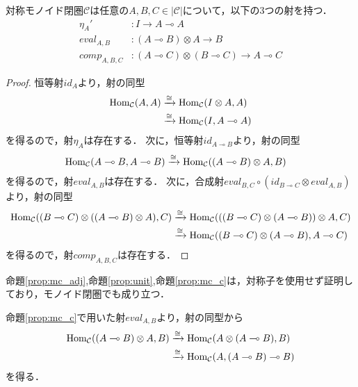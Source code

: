 \documentclass[type_judgement.tex]{subfiles}
\begin{document}
\begin{prop}
\label{prop:mc_c}
対称モノイド閉圏$\mathcal{C}$は任意の$A,B,C\in|\mathcal{C}|$について，以下の3つの射を持つ．
\begin{align*}
    \eta_{A}'    &: I \rightarrow A \multimap A \\
    eval_{A,B}   &: (A \multimap B) \otimes A \rightarrow B \\
    comp_{A,B,C} &: (A \multimap C) \otimes (B \multimap C) \rightarrow A \multimap C
\end{align*}
\end{prop}
\begin{proof}
恒等射$id_A$より，射の同型
\begin{align*}
    \mathop{\mathrm{Hom}}\nolimits_\mathcal{C}(A,A) &\xrightarrow{\cong} \mathop{\mathrm{Hom}}\nolimits_\mathcal{C}(I \otimes A, A) \\
    &\xrightarrow{\cong} \mathop{\mathrm{Hom}}\nolimits_\mathcal{C}(I, A \multimap A)
\end{align*}
を得るので，射$\eta_{A}$は存在する．
次に，恒等射$id_{A \multimap B}$より，射の同型
\begin{align*}
    \mathop{\mathrm{Hom}}\nolimits_\mathcal{C}(A \multimap B, A \multimap B) &\xrightarrow{\cong} \mathop{\mathrm{Hom}}\nolimits_\mathcal{C}((A \multimap B) \otimes A, B)
\end{align*}
を得るので，射$eval_{A,B}$は存在する．
次に，合成射$eval_{B,C}\circ(id_{B\multimap{}C}\otimes eval_{A,B})$より，射の同型
\begin{align*}
    \mathop{\mathrm{Hom}}\nolimits_\mathcal{C}((B \multimap C)\otimes((A \multimap B)\otimes A), C) &\xrightarrow{\cong} \mathop{\mathrm{Hom}}\nolimits_\mathcal{C}( ((B \multimap C)\otimes(A \multimap B)) \otimes A, C) \\
    &\xrightarrow{\cong} \mathop{\mathrm{Hom}}\nolimits_\mathcal{C}((B \multimap C) \otimes (A \multimap B), A \multimap C)
\end{align*}
を得るので，射$comp_{A,B,C}$は存在する．
\end{proof}

命題\ref{prop:mc_adj},命題\ref{prop:unit},命題\ref{prop:mc_c}は，対称子を使用せず証明しており，モノイド閉圏でも成り立つ．

命題\ref{prop:mc_c}で用いた射$eval_{A,B}$より，射の同型から
\begin{align*}
    \mathop{\mathrm{Hom}}\nolimits_\mathcal{C}((A\multimap B) \otimes A, B) &\xrightarrow{\cong} \mathop{\mathrm{Hom}}\nolimits_\mathcal{C}(A \otimes (A \multimap B), B) \\
    &\xrightarrow{\cong} \mathop{\mathrm{Hom}}\nolimits_\mathcal{C}(A, (A \multimap B) \multimap B)
\end{align*}
を得る．
\end{document}
